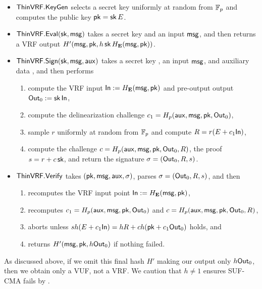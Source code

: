 \begin{itemize}
\item ${\mathsf{ThinVRF}}.{\mathsf{KeyGen}}$ selects a secret key \sk uniformly at random from $\mathbb{F}_p$ and computes the public key $\mathsf{pk} = \mathsf{sk} \, E$.
\item ${\mathsf{ThinVRF}}.{\mathsf{Eval}}(\mathsf{sk},\mathsf{msg})$ takes a secret key \sk and an input $\mathsf{msg}$, and
 then returns a VRF output $H'(\mathsf{msg},\mathsf{pk},h \, \mathsf{sk} \, H_{{\mathbf{E}}}(\mathsf{msg},\mathsf{pk}))$.
\item ${\mathsf{ThinVRF}}.{\mathsf{Sign}}(\mathsf{sk},\mathsf{msg},\mathsf{aux})$ takes a secret key \sk, an input $\mathsf{msg}$, and auxiliary data \aux, and then performs
\begin{enumerate}
    \item compute the VRF input ${\mathsf{In}} := H_{{\mathbf{E}}}(\mathsf{msg},\mathsf{pk})$ and pre-output output ${\mathsf{Out}}_0 := \mathsf{sk} \, {\mathsf{In}}$, 
    \item compute the delinearization challenge $c_1 = H_p(\mathsf{aux},\mathsf{msg},\mathsf{pk},{\mathsf{Out}}_0)$,
    \item sample $r$ uniformly at random from $\mathbb{F}_p$ and compute $R = r (E + c_1 {\mathsf{In}})$,
    \item compute the challenge $c = H_p(\mathsf{aux},\mathsf{msg},\mathsf{pk},{\mathsf{Out}}_0,R)$, the proof $s = r + c \, \mathsf{sk}$, and return the signature $\sigma = ({\mathsf{Out}}_0,R,s)$.
\end{enumerate}
\item ${\mathsf{ThinVRF}}.{\mathsf{Verify}}$ takes $(\mathsf{pk},\mathsf{msg},\mathsf{aux},\sigma)$, parses $\sigma = ({\mathsf{Out}}_0,R,s)$, and then 
\begin{enumerate}
    \item recomputes the VRF input point ${\mathsf{In}} := H_{{\mathbf{E}}}(\mathsf{msg},\mathsf{pk})$,
    \item recomputes $c_1 = H_p(\mathsf{aux},\mathsf{msg},\mathsf{pk},{\mathsf{Out}}_0)$ and $c = H_p(\mathsf{aux},\mathsf{msg},\mathsf{pk},{\mathsf{Out}}_0,R)$, %
    \item aborts unless $s h (E + c_1 {\mathsf{In}}) = h R + c h (\mathsf{pk} + c_1 {\mathsf{Out}}_0)$ holds, and 
    \item returns $H'(\mathsf{msg},\mathsf{pk},h {\mathsf{Out}}_0)$ if nothing failed.
\end{enumerate}
\end{itemize}
As discussed above, if we omit this final hash $H'$ making
our output only $h {\mathsf{Out}}_0$, then we obtain only a VUF, not a VRF.
We caution that $h \ne 1$ ensures SUF-CMA fails
 by \cite[\S4.1.2]{cryptoeprint:2020:823}.

